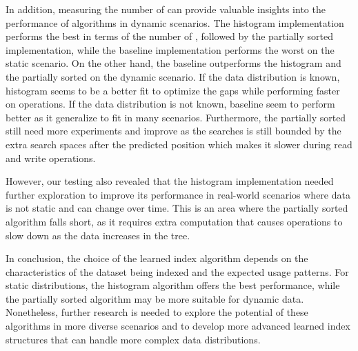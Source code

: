 In addition, measuring the number of \conflict can provide valuable insights into the performance of \learnindex algorithms in dynamic scenarios. The histogram implementation performs the best in terms of the number of \conflict, followed by the partially sorted implementation, while the baseline implementation performs the worst on the static scenario. On the other hand, the baseline outperforms the histogram and the partially sorted on the dynamic scenario. If the data distribution is known, histogram seems to be a better fit to optimize the gaps while performing faster on operations. If the data distribution is not known, baseline seem to perform better as it generalize to fit in many scenarios. Furthermore, the partially sorted still need more experiments and improve as the searches is still bounded by the extra search spaces after the predicted position which makes it slower during read and write operations.

However, our testing also revealed that the histogram implementation needed further exploration to improve its performance in real-world scenarios where data is not static and can change over time. This is an area where the partially sorted algorithm falls short, as it requires extra computation that causes operations to slow down as the data increases in the tree.

In conclusion, the choice of the learned index algorithm depends on the characteristics of the dataset being indexed and the expected usage patterns. For static distributions, the histogram algorithm offers the best performance, while the partially sorted algorithm may be more suitable for dynamic data. Nonetheless, further research is needed to explore the potential of these algorithms in more diverse scenarios and to develop more advanced learned index structures that can handle more complex data distributions.